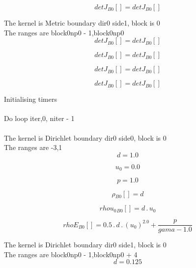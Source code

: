 \documentclass{article}
\begin{document}
\begin{dmath}{detJ{_{B0}}}[{}] = {detJ{_{B0}}}[{}]\end{dmath}

\noindent The kernel is Metric boundary dir0 side1, block is 0\\\noindent The ranges are block0np0 - 1,block0np0\\\begin{dmath}{detJ{_{B0}}}[{}] = {detJ{_{B0}}}[{}]\end{dmath}

\begin{dmath}{detJ{_{B0}}}[{}] = {detJ{_{B0}}}[{}]\end{dmath}

\begin{dmath}{detJ{_{B0}}}[{}] = {detJ{_{B0}}}[{}]\end{dmath}

\begin{dmath}{detJ{_{B0}}}[{}] = {detJ{_{B0}}}[{}]\end{dmath}

\noindent Initialising timers\\
\\\noindent Do loop iter,0, niter - 1\\
\\\noindent The kernel is Dirichlet boundary dir0 side0, block is 0\\\noindent The ranges are -3,1\\\begin{dmath}d = 1.0\end{dmath}

\begin{dmath}u_{0} = 0.0\end{dmath}

\begin{dmath}p = 1.0\end{dmath}

\begin{dmath}{\rho{_{B0}}}[{}] = d\end{dmath}

\begin{dmath}{rhou_{0}{_{B0}}}[{}] = d \,.\, u_{0}\end{dmath}

\begin{dmath}{rhoE{_{B0}}}[{}] = 0.5 \,.\, d \,.\, \left(u_{0} \right)^{2.0} + \frac{p}{gama - 1.0}\end{dmath}

\noindent The kernel is Dirichlet boundary dir0 side1, block is 0\\\noindent The ranges are block0np0 - 1,block0np0 + 4\\\begin{dmath}d = 0.125\end{dmath}
\end{document}
